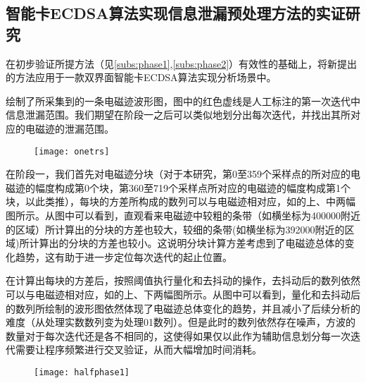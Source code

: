 {	\subsection{智能卡ECDSA算法实现信息泄漏预处理方法的实证研究}
	
	在初步验证所提方法（见\ref{subs:phase1},\ref{subs:phase2}）有效性的基础上，将新提出的方法应用于一款双界面智能卡ECDSA算法实现分析场景中。
	
	绘制了所采集到的一条电磁迹波形图，图中的红色虚线是人工标注的第一次迭代中信息泄漏范围。我们期望在阶段一之后可以类似地划分出每次迭代，并找出其所对应的电磁迹的泄漏范围。
	
	\begin{figure}[!h]
		\begin{center}
			\texttt{[image: onetrs]}
			\label{fig:onetrs}
		\end{center}
	\end{figure}
	
	在阶段一，我们首先对电磁迹分块（对于本研究，第0至359个采样点的所对应的电磁迹的幅度构成第0个块，第360至719个采样点所对应的电磁迹的幅度构成第1个块，以此类推），每块的方差所构成的数列可以与电磁迹相对应，如的上、中两幅图所示。从图中可以看到，直观看来电磁迹中较粗的条带（如横坐标为400000附近的区域）所计算出的分块的方差也较大，较细的条带(如横坐标为392000附近的区域)所计算出的分块的方差也较小。这说明分块计算方差考虑到了电磁迹总体的变化趋势，这有助于进一步定位每次迭代的起止位置。
	
	在计算出每块的方差后，按照阈值执行量化和去抖动的操作，去抖动后的数列依然可以与电磁迹相对应，如的上、下两幅图所示。从图中可以看到，量化和去抖动后的数列所绘制的波形图依然体现了电磁迹总体变化的趋势，并且减小了后续分析的难度（从处理实数数列变为处理01数列）。但是此时的数列依然存在噪声，方波的数量对于每次迭代还是各不相同的，这使得如果仅以此作为辅助信息划分每一次迭代需要让程序频繁进行交叉验证，从而大幅增加时间消耗。
	
	\begin{figure}[!h]
		\begin{center}
			\texttt{[image: halfphase1]}
			\label{fig:halfphase1}
		\end{center}
	\end{figure}

}
